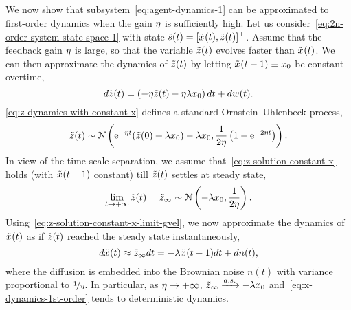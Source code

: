 
\subsection{}\label{app:time-scale-separation}

We now show that subsystem~\eqref{eq:agent-dynamics-1}
can be approximated to first-order dynamics
when the gain $ \eta $ is sufficiently high.
Let us consider~\eqref{eq:2n-order-system-state-space-1} with state $ \tilde{s}(t) = [\tilde{x}_{}(t),\tilde{z}_{}(t)]^\top $.
Assume that the feedback gain $ \eta $ is large,
so that the variable $ \tilde{z}_{}(t) $ evolves faster than $ \tilde{x}_{}(t) $.
We can then approximate the dynamics of $ \tilde{z}_{}(t) $ 
by letting $ \tilde{x}_{}(t-1) \equiv x_0 $ be constant overtime,
\begin{equation}\label{eq:z-dynamics-with-constant-x}
d\tilde{z}_{}(t) = \left(-\eta \tilde{z}_{}(t) - \eta\lambda x_0\right)dt + dw_{}(t).
\end{equation}
\cref{eq:z-dynamics-with-constant-x} defines a standard Ornstein–Uhlenbeck process,
\begin{equation}\label{eq:z-solution-constant-x}
\tilde{z}_{}(t) \sim \mathcal{N}\left( \mathrm{e}^{-\eta t}(\tilde{z}_{}(0) + \lambda x_0) - \lambda x_0, \dfrac{1}{2\eta}\left(1-\mathrm{e}^{-2\eta t}\right) \right).
\end{equation}
In view of the time-scale separation,
we assume that~\eqref{eq:z-solution-constant-x} holds (with $ \tilde{x}_{}(t-1) $ constant) till $ \tilde{z}_{}(t) $ settles at steady state, %
\begin{equation}\label{eq:z-solution-constant-x-limit-gvel}
\lim_{t \rightarrow +\infty}\tilde{z}_{}(t) = \tilde{z}_{\infty} \sim \mathcal{N}\left( - \lambda x_0, \dfrac{1}{2\eta} \right).
\end{equation}
Using~\eqref{eq:z-solution-constant-x-limit-gvel},
we now approximate the dynamics of $ \tilde{x}_{}(t) $ %
as if $ \tilde{z}_{}(t) $ reached the steady state instantaneously,
\begin{equation}\label{eq:x-dynamics-1st-order}
d\tilde{x}_{}(t) \approx \tilde{z}_{\infty}dt = -\lambda\tilde{x}_{}(t-1)dt + dn(t),
\end{equation}
where 
the diffusion is embedded into the Brownian noise $ n(t) $ with variance proportional to $ \nicefrac{1}{\eta} $.
In particular, as $ \eta \rightarrow +\infty $,
$ \tilde{z}_{\infty} \xrightarrow{a.s.} - \lambda x_0 $
and~\eqref{eq:x-dynamics-1st-order} tends to deterministic dynamics.